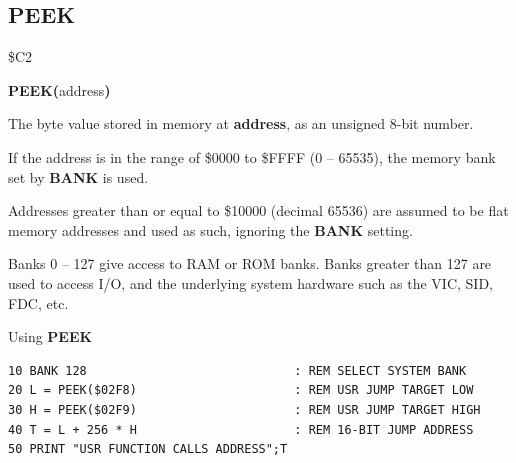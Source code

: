 
\newpage
\subsection{PEEK}
\begin{description}[leftmargin=2cm,style=nextline]
\item [Token:]    \$C2

\item [Format:]   {\bf PEEK(}address{\bf)}

\item [Returns:]  The byte value stored in memory at {\bf address}, as an unsigned 8-bit number.

                  If the address is in the range of \$0000 to \$FFFF (0 -- 65535), the memory bank set by {\bf BANK} is used.

                  Addresses greater than or equal to \$10000 (decimal 65536) are assumed to be flat memory addresses and used as such, ignoring the {\bf BANK} setting.

\item [Remarks:]  Banks 0 -- 127 give access to RAM or ROM banks. Banks greater than 127 are used to access I/O, and the underlying system hardware such as the VIC, SID, FDC, etc.

\item [Example:]  Using {\bf PEEK}

\begin{tcolorbox}[colback=black,coltext=white]
\verbatimfont{\codefont}
\begin{verbatim}
10 BANK 128                             : REM SELECT SYSTEM BANK
20 L = PEEK($02F8)                      : REM USR JUMP TARGET LOW
30 H = PEEK($02F9)                      : REM USR JUMP TARGET HIGH
40 T = L + 256 * H                      : REM 16-BIT JUMP ADDRESS
50 PRINT "USR FUNCTION CALLS ADDRESS";T
\end{verbatim}
\end{tcolorbox}
\end{description}


\newpage
